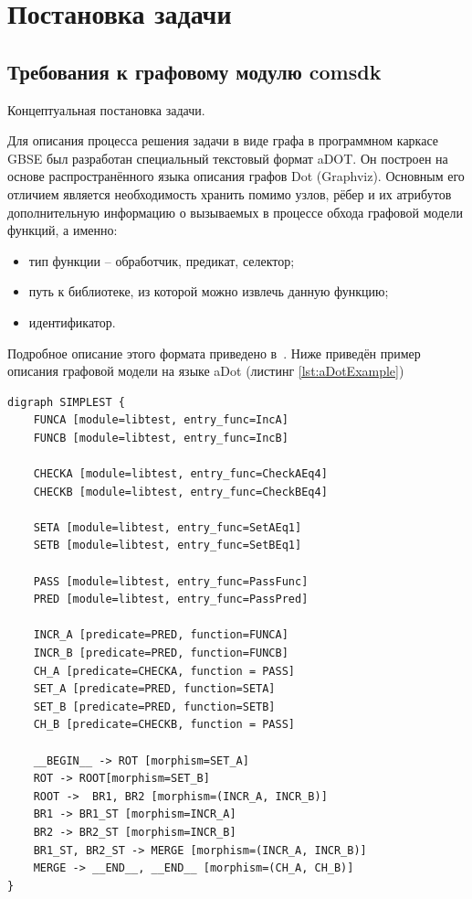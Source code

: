 \chapter{Постановка задачи}
\section{Требования к графовому модулю comsdk}\label{section:requirements}
Концептуальная постановка задачи.

Для описания процесса решения задачи в виде графа в программном каркасе GBSE был разработан специальный текстовый формат \gls{aDOT}. Он построен на основе распространённого языка описания графов Dot (Graphviz)\cite{GraphvizDot2022}. Основным его отличием является необходимость хранить помимо узлов, рёбер и их атрибутов дополнительную информацию о вызываемых в процессе обхода графовой модели функций, а именно:
\begin{itemize}
    \item тип функции -- обработчик, предикат, селектор;
    \item путь к библиотеке, из которой можно извлечь данную функцию;
    \item идентификатор.
\end{itemize}
Подробное описание этого формата приведено в~\cite{SokolovADOT2020}.
Ниже приведён пример описания графовой модели на языке aDot (листинг \ref{lst:aDotExample})
\begin{lstlisting}[label={lst:aDotExample}, caption={Пример описания графовой модели на языке aDot}]
digraph SIMPLEST {
    FUNCA [module=libtest, entry_func=IncA]
    FUNCB [module=libtest, entry_func=IncB]
    
    CHECKA [module=libtest, entry_func=CheckAEq4]
    CHECKB [module=libtest, entry_func=CheckBEq4]
    
    SETA [module=libtest, entry_func=SetAEq1]
    SETB [module=libtest, entry_func=SetBEq1]

    PASS [module=libtest, entry_func=PassFunc]
    PRED [module=libtest, entry_func=PassPred]

    INCR_A [predicate=PRED, function=FUNCA]
    INCR_B [predicate=PRED, function=FUNCB]
    CH_A [predicate=CHECKA, function = PASS]
    SET_A [predicate=PRED, function=SETA]
    SET_B [predicate=PRED, function=SETB]
    CH_B [predicate=CHECKB, function = PASS]
    
    __BEGIN__ -> ROT [morphism=SET_A]
    ROT -> ROOT[morphism=SET_B]
    ROOT ->  BR1, BR2 [morphism=(INCR_A, INCR_B)]
    BR1 -> BR1_ST [morphism=INCR_A]
    BR2 -> BR2_ST [morphism=INCR_B]
    BR1_ST, BR2_ST -> MERGE [morphism=(INCR_A, INCR_B)]
    MERGE -> __END__, __END__ [morphism=(CH_A, CH_B)]
}
\end{lstlisting}

